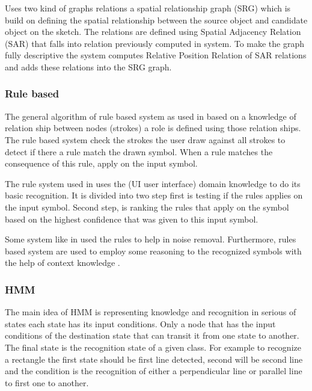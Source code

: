 \cite{SRGraph57}  Uses two kind of graphs relations a spatial relationship graph (SRG) which is build on defining the spatial relationship between the source object and candidate object on the sketch. The relations are defined using Spatial Adjacency Relation (SAR) that falls into relation previously computed in system.   To make the graph fully descriptive the system computes Relative Position Relation of SAR relations and adds these relations into the SRG graph.

\subsubsection{Rule based }
\label{sec:Rule based }


The general algorithm of rule based system as used in \cite{interpretationmechanical50,SmartSketch56}  based on a knowledge of relation ship between nodes (strokes) a role is defined using those relation ships. The rule based system check the strokes the user draw against all strokes to detect if there a rule match the drawn symbol. When a rule matches the consequence of this rule, apply on the input symbol.


The rule system used in \cite{sketchinginterfaces2}  uses the (UI user interface) domain knowledge to do its basic recognition. It is divided into two step first is testing if the rules applies on the input symbol. Second step, is ranking the rules that apply on the symbol based on the highest confidence that was given to this input symbol.

Some system like in \cite{SmartSketch56}  used the rules to help in noise removal. Furthermore, rules based system are used to employ some reasoning to the recognized symbols with the help of context knowledge \cite {interpretationmechanical50}.

\subsubsection{HMM }
\label{sec:HMM }

 The main idea of HMM is representing knowledge and recognition in serious of states each state has its input conditions. Only a node that has the input conditions of the destination state that can transit it from one state to another. The final state is the recognition state of a given class. For example to recognize a rectangle the first state should be first line detected, second will be second line and the condition is the recognition of either a perpendicular line or parallel line to first one to another. 



